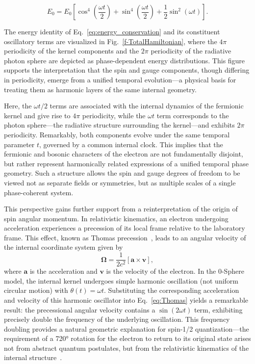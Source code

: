 \documentclass[%
 reprint,
 amsmath,amssymb,
 aps,
]{revtex4-1}
\numberwithin{equation}{section}%
\begin{document}
\begin{equation}
E_0 = E_0\left[\cos^4\left(\frac{\omega t}{2}\right) + \sin^4\left(\frac{\omega t}{2}\right) + \frac{1}{2}\sin^2(\omega t)\right].
\label{eq:energy_conservation}
\end{equation}

The energy identity of Eq.~\eqref{eq:energy_conservation} and its constituent oscillatory terms are visualized in Fig.~\ref{f-TotalHamiltonian}, where the $4\pi$ periodicity of the kernel components and the $2\pi$ periodicity of the radiative photon sphere are depicted as phase-dependent energy distributions. This figure supports the interpretation that the spin and gauge components, though differing in periodicity, emerge from a unified temporal evolution—a physical basis for treating them as harmonic layers of the same internal geometry.

Here, the $\omega t/2$ terms are associated with the internal dynamics of the fermionic kernel and give rise to $4\pi$ periodicity, while the $\omega t$ term corresponds to the photon sphere—the radiative structure surrounding the kernel—and exhibits $2\pi$ periodicity. Remarkably, both components evolve under the same temporal parameter $t$, governed by a common internal clock. This implies that the fermionic and bosonic characters of the electron are not fundamentally disjoint, but rather represent harmonically related expressions of a unified temporal phase geometry. Such a structure allows the spin and gauge degrees of freedom to be viewed not as separate fields or symmetries, but as multiple scales of a single phase-coherent system.

This perspective gains further support from a reinterpretation of the origin of spin angular momentum. In relativistic kinematics, an electron undergoing acceleration experiences a precession of its local frame relative to the laboratory frame. This effect, known as Thomas precession~\cite{Thomas1926, thomas1927}, leads to an angular velocity of the internal coordinate system given by~\cite{hanamura2023}
\begin{equation}
\boldsymbol{\Omega} = \frac{1}{2c^2}[\boldsymbol{a} \times \boldsymbol{v}],
\label{eq:Thomas}
\end{equation}
where $\boldsymbol{a}$ is the acceleration and $\boldsymbol{v}$ is the velocity of the electron. In the 0-Sphere model, the internal kernel undergoes simple harmonic oscillation (not uniform circular motion) with $\theta(t) = \omega t$. Substituting the corresponding acceleration and velocity of this harmonic oscillator into Eq.~\eqref{eq:Thomas} yields a remarkable result: the precessional angular velocity contains a $\sin(2\omega t)$ term, exhibiting precisely double the frequency of the underlying oscillation. This frequency doubling provides a natural geometric explanation for spin-1/2 quantization—the requirement of a 720° rotation for the electron to return to its original state arises not from abstract quantum postulates, but from the relativistic kinematics of the internal structure~\cite{hanamura2023}.
\end{document}
